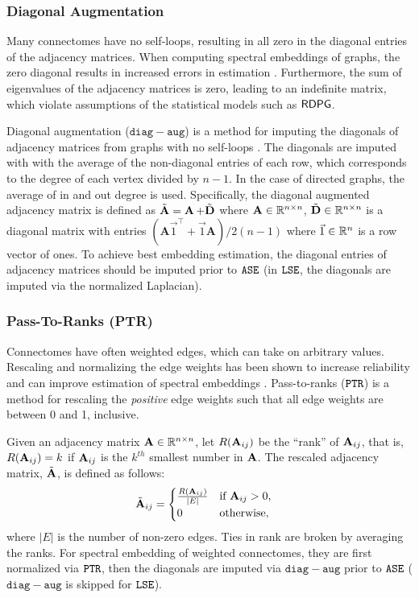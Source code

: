 \subsubsection{Diagonal Augmentation}\label{sec:diag-aug}
Many connectomes have no self-loops, resulting in all zero in the diagonal entries of the adjacency matrices. When computing spectral embeddings of graphs, the zero diagonal results in increased errors in estimation \cite{tang2018connectome}. Furthermore, the sum of eigenvalues of the adjacency matrices is zero, leading to an indefinite matrix, which violate assumptions of the statistical models such as $\operatorname{\mathsf{RDPG}}$. 

Diagonal augmentation ($\mathtt{diag-aug}$) is a method for imputing the diagonals of adjacency matrices from graphs with no self-loops \cite{marchette2011vertex,tang2018connectome,scheinerman2010modeling}. The diagonals are imputed with with the average of the non-diagonal entries of each row, which corresponds to the degree of each vertex divided by $n-1$. In the case of directed graphs, the average of in and out degree is used. Specifically, the diagonal augmented adjacency matrix is defined as $\tilde {\operatorname{\mathbf{A}}} = \operatorname{\mathbf{A}} + \tilde{\operatorname{\mathbf{D}}}$ where $\operatorname{\mathbf{A}}\in\mathbb{R}^{n\times n}$, $\tilde {\operatorname{\mathbf{D}}} \in\mathbb{R}^{n\times n}$ is a diagonal matrix with entries $(\mathbf{A}\vec 1^\top + \vec 1\mathbf{A}) /2(n-1)$ where $\vec 1 \in\mathbb{R}^n$ is a row vector of ones. To achieve best embedding estimation, the diagonal entries of adjacency matrices should be imputed prior to $\operatorname{\mathtt{ASE}}$ (in $\operatorname{\mathtt{LSE}}$, the diagonals are imputed via the normalized Laplacian).

\subsubsection{Pass-To-Ranks (PTR)}
Connectomes have often weighted edges, which can take on arbitrary values. Rescaling and normalizing the edge weights has been shown to increase reliability and can improve estimation of spectral embeddings \cite{Kiar188706}. Pass-to-ranks ($\operatorname{\mathtt{PTR}}$) is a method for rescaling the \textit{positive} edge weights such that all edge weights are between 0 and 1, inclusive. 

Given an adjacency matrix $\operatorname{\mathbf{A}} \in \mathbb{R}^{n\times n}$, let $R(\operatorname{\mathbf{A}}_{ij})$ be the ``rank'' of $\operatorname{\mathbf{A}}_{ij}$, that is, $R(\operatorname{\mathbf{A}}_{ij}) = k$ if $\operatorname{\mathbf{A}}_{ij}$ is the $k^{th}$ smallest number in $\operatorname{\mathbf{A}}$. The rescaled adjacency matrix, $\Tilde{\operatorname{\mathbf{A}}}$, is defined as follows:
\begin{align*}
    \Tilde{\operatorname{\mathbf{A}}}_{ij} &= \begin{cases}
    \frac{R(\operatorname{\mathbf{A}}_{ij})}{|E|} & \text{if $\operatorname{\mathbf{A}}_{ij} > 0$},\\
    0 & \text{otherwise},
    \end{cases}
\end{align*}
where $|E|$ is the number of non-zero edges. Ties in rank are broken by averaging the ranks. For spectral embedding of weighted connectomes, they are first normalized via $\operatorname{\mathtt{PTR}}$, then the diagonals are imputed via $\mathtt{diag-aug}$ prior to $\operatorname{\mathtt{ASE}}$ ($\mathtt{diag-aug}$ is skipped for $\operatorname{\mathtt{LSE}}$). 

